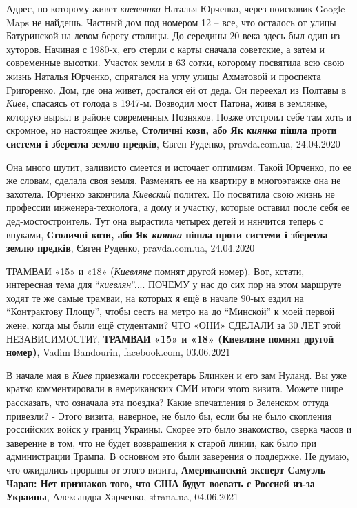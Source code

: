 Адрес, по которому живет \emph{киевлянка} Наталья Юрченко, через поисковик Google Maps
не найдешь.  Частный дом под номером 12 – все, что осталось от улицы
Батуринской на левом берегу столицы.  До середины 20 века здесь был один из
хуторов. Начиная с 1980-х, его стерли с карты сначала советские, а затем и
современные высотки. Участок земли в 63 сотки, которому посвятила всю свою
жизнь Наталья Юрченко, спрятался на углу улицы Ахматовой и проспекта
Григоренко.  Дом, где она живет, достался ей от деда. Он переехал из Полтавы в
\emph{Киев}, спасаясь от голода в 1947-м. Возводил мост Патона, живя в землянке,
которую вырыл в районе современных Позняков. Позже отстроил себе там хоть и
скромное, но настоящее жилье,
\textbf{Столичні кози, або Як \emph{киянка} пішла проти системи і зберегла землю предків},
Євген Руденко, pravda.com.ua, 24.04.2020

Она много шутит, заливисто смеется и источает оптимизм. Такой Юрченко, по ее же
словам, сделала своя земля. Разменять ее на квартиру в многоэтажке она не
захотела.  Юрченко закончила \emph{Киевский} политех. Но посвятила свою жизнь
не профессии инженера-технолога, а дому и участку, которые оставил после себя
ее дед-мостостроитель. Тут она вырастила четырех детей и нянчится теперь с
внуками,
\textbf{Столичні кози, або Як \emph{киянка} пішла проти системи і зберегла землю предків},
Євген Руденко, pravda.com.ua, 24.04.2020

ТРАМВАИ «15» и «18» (\emph{Киевляне} помнят другой номер).  Вот, кстати,
интересная тема для \enquote{\emph{киевлян}}.... ПОЧЕМУ у нас до сих пор на
этом маршруте ходят те же самые трамваи, на которых я ещё в начале 90-ых ездил
на \enquote{Контрактову Площу}, чтобы сесть на метро на до \enquote{Минской} к
моей первой жене, когда мы были ещё студентами? ЧТО «ОНИ» СДЕЛАЛИ за 30 ЛЕТ
этой НЕЗАВИСИМОСТИ?,
\textbf{ТРАМВАИ «15» и «18» (Киевляне помнят другой номер)}, Vadim Bandourin, facebook.com, 03.06.2021

В начале мая в \emph{Киев} приезжали госсекретарь Блинкен и его зам Нуланд. Вы
уже кратко комментировали в американских СМИ итоги этого визита. Можете шире
рассказать, что означала эта поездка? Какие впечатления о Зеленском оттуда
привезли? - Этого визита, наверное, не было бы, если бы не было скопления
российских войск у границ Украины. Скорее это было знакомство, сверка часов и
заверение в том, что не будет возвращения к старой линии, как было при
администрации Трампа. В основном это были заверения о поддержке. Не думаю, что
ожидались прорывы от этого визита,
\textbf{Американский эксперт Самуэль Чарап: Нет признаков того, что США будут воевать с Россией из-за Украины},
Александра Харченко, strana.ua, 04.06.2021

